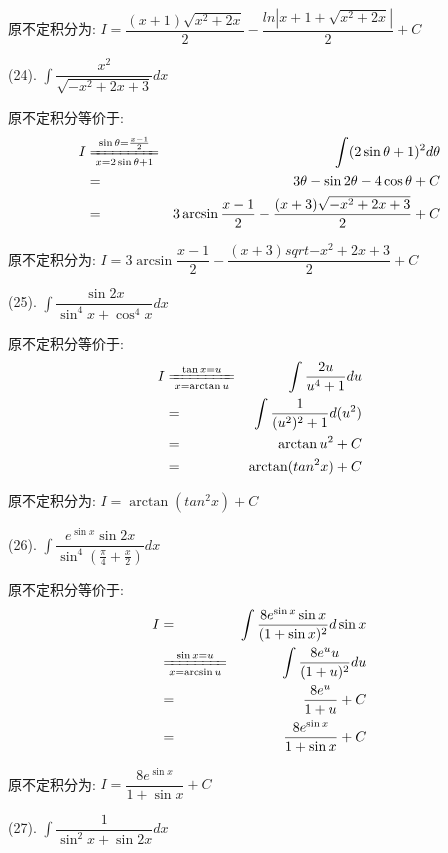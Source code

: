 \begin{anymark}[积分训练]
\begin{solution}
		原不定积分为:  $I=\dfrac{(x+1)\sqrt{x^2+2x}}{2}-\dfrac{ln|x+1+\sqrt{x^2+2x}|}{2}+C$
	\end{solution}
	(24). $\int \dfrac{x^2}{\sqrt{-x^2+2x+3}}dx$
	\begin{solution}
		
		原不定积分等价于:  
		\begin{eqnarray*}
			I&\xlongequal[x=2\sin\theta+1]{\sin\theta=\frac{x-1}{2}}&\int (2\sin\theta+1)^2d\theta\\
			&=&3\theta-\sin2\theta-4\cos\theta+C\\
			&=&3\arcsin\dfrac{x-1}{2}-\dfrac{(x+3)\sqrt{-x^2+2x+3}}{2}+C
		\end{eqnarray*}
		
		原不定积分为:  $I=3\arcsin\dfrac{x-1}{2}-\dfrac{(x+3)sqrt{-x^2+2x+3}}{2}+C$
	\end{solution}
	(25). $\int \dfrac{\sin 2x}{\sin^4 x+\cos^4 x}dx$
	\begin{solution}
		
		原不定积分等价于:  
		\begin{eqnarray*}
			I&\xlongequal[x=\arctan u]{\tan x=u}&\int \dfrac{2u}{u^4+1}du\\
			&=&\int \dfrac{1}{(u^2)^2+1}d(u^2)\\
			&=&\arctan u^2+C\\
			&=&\arctan(tan^2 x)+C
		\end{eqnarray*}
		
		原不定积分为:  $I=\arctan(tan^2 x)+C$
	\end{solution}
	(26). $\int \dfrac{e^{\sin x}\sin 2x}{\sin^4(\frac{\pi}{4}+\frac{x}{2})}dx$
	\begin{solution}
		
		原不定积分等价于:  
		\begin{eqnarray*}
			I&=&\int \dfrac{8e^{\sin x}\sin x}{(1+\sin x)^2}d\sin x\\
			&\xlongequal[x=\arcsin u]{\sin x=u}&\int\dfrac{8e^{u}u}{(1+u)^2}du\\
			&=&\dfrac{8e^u}{1+u}+C \\
			&=&\dfrac{8e^{\sin x}}{1+\sin x}+C
		\end{eqnarray*}
		
		原不定积分为:  $I=\dfrac{8e^{\sin x}}{1+\sin x}+C$
	\end{solution}
	(27). $\int \dfrac{1}{\sin^2x+\sin 2x}dx$
	\begin{solution}
		

\end{solution}
\end{anymark}
